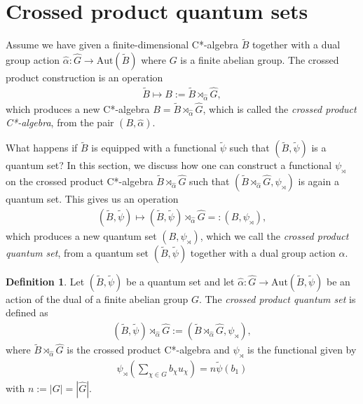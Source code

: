\documentclass{amsart}
\theoremstyle{definition}
\newtheorem{definition}[thm]{Definition}
\theoremstyle{definition}
\begin{document}
\section{Crossed product quantum sets}
\label{sec::crossed_prod_qsets}

Assume we have given a finite-dimensional C*-algebra $\tilde{B}$ together with a dual group action $\hat{\alpha}: \hat{G} \to \mathrm{Aut}(\tilde{B})$ where $G$ is a finite abelian group. The crossed product construction is an operation
\begin{align*}
    \tilde{B} \mapsto B := \tilde{B} \rtimes_{\hat{\alpha}} \hat{G},
\end{align*}
which produces a new C*-algebra $B = \tilde{B} \rtimes_{\hat{\alpha}} \hat{G}$, which is called the \emph{crossed product C*-algebra}, from the pair $(B, \hat{\alpha})$.

What happens if $\tilde{B}$ is equipped with a functional $\tilde{\psi}$ such that $(\tilde{B}, \tilde{\psi})$ is a quantum set? In this section, we discuss how one can construct a functional $\psi_\rtimes$ on the crossed product C*-algebra $\tilde{B} \rtimes_{\hat{\alpha}} \hat{G}$ such that $(\tilde{B} \rtimes_{\hat{\alpha}} \hat{G}, \psi_\rtimes)$ is again a quantum set. This gives us an operation
\begin{align*}
    (\tilde{B}, \tilde{\psi}) \mapsto (\tilde{B}, \tilde{\psi}) \rtimes_{\hat{\alpha}} \hat{G} =: (B, \psi_\rtimes),
\end{align*}
which produces a new quantum set $(B, \psi_\rtimes)$, which we call the \emph{crossed product quantum set}, from a quantum set $(\tilde{B}, \tilde{\psi})$ together with a dual group action $\hat{\alpha}$.


\begin{definition}
    \label{crossed::def:crossed_product_quantum_set}
    Let $(\tilde{B}, \tilde{\psi})$ be a quantum set and let $\hat{\alpha}: \hat{G} \to \mathrm{Aut}(\tilde{B}, \tilde{\psi})$ be an action of the dual of a finite abelian group $G$. The \emph{crossed product quantum set} is defined as
    \begin{align*}
        (\tilde{B}, \tilde{\psi}) \rtimes_{\hat{\alpha}} \hat{G} := \left( \tilde{B} \rtimes_{\hat{\alpha}} \hat{G}, \psi_\rtimes \right),
    \end{align*}
    where $\tilde{B} \rtimes_{\hat{\alpha}} \hat{G}$ is the crossed product C*-algebra and $\psi_\rtimes$ is the functional given by
    \begin{align*}
        \psi_\rtimes\left( \sum_{\chi \in \hat{G}} b_\chi u_\chi \right) = n \tilde{\psi}(b_1)
    \end{align*}
    with $n := |G| =|\hat{G}|$.
\end{definition}
\end{document}

